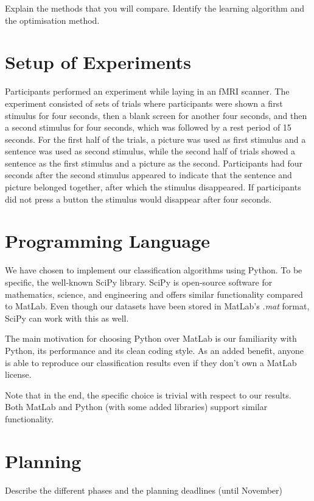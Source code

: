 \documentclass[a4paper, 11pt]{scrartcl}
\begin{document}
Explain the methods that you will compare. Identify the learning algorithm and the optimisation method.

\section{Setup of Experiments}
\label{sec:setup}

Participants performed an experiment while laying in an fMRI scanner. The experiment consisted of sets of trials where participants were shown a first stimulus for four seconds, then a blank screen for another four seconds, and then a second stimulus for four seconds, which was followed by a rest period of 15 seconds. For the first half of the trials, a picture was used as first stimulus and a sentence was used as second stimulus, while the second half of trials showed a sentence as the first stimulus and a picture as the second. Participants had four seconds after the second stimulus appeared to indicate that the sentence and picture belonged together, after which the stimulus disappeared. If participants did not press a button the stimulus would disappear after four seconds.

\section{Programming Language}
\label{sec:language}

We have chosen to implement our classification algorithms using Python. To be specific,  the well-known SciPy library. SciPy is open-source software for mathematics, science, and engineering and offers similar functionality compared to MatLab. Even though our datasets have been stored in MatLab's \textit{.mat} format, SciPy can work with this as well.

The main motivation for choosing Python over MatLab is our familiarity with Python, its performance and its clean coding style. As an added benefit, anyone is able to reproduce our classification results even if they don't own a MatLab license. 

Note that in the end, the specific choice is trivial with respect to our results. Both MatLab and Python (with some added libraries) support similar functionality.

\section{Planning}

Describe the different phases and the planning deadlines (until November)
\end{document}
